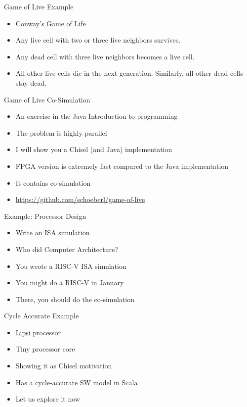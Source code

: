 \begin{frame}[fragile]{Game of Live Example}
\begin{itemize}
\item \href{https://en.wikipedia.org/wiki/Conway\%27s_Game_of_Life}{Conway's Game of Life}
\item Any live cell with two or three live neighbors survives.
\item Any dead cell with three live neighbors becomes a live cell.
\item All other live cells die in the next generation. Similarly, all other dead cells stay dead.
\end{itemize}
\end{frame}

\begin{frame}[fragile]{Game of Live Co-Simulation}
\begin{itemize}
\item An exercise in the Java Introduction to programming
\item The problem is highly parallel
\item I will show you a Chisel (and Java) implementation
\item FPGA version is extremely fast compared to the Java implementation
\item It contains co-simulation
\item \url{https://github.com/schoeberl/game-of-live}
\end{itemize}
\end{frame}

\begin{frame}[fragile]{Example: Processor Design}
\begin{itemize}
\item Write an ISA simulation
\item Who did Computer Architecture?
\item You wrote a RISC-V ISA simulation
\item You might do a RISC-V in January
\item There, you should do the co-simulation
\end{itemize}
\end{frame}

\begin{frame}[fragile]{Cycle Accurate Example}
\begin{itemize}
\item \href{https://github.com/schoeberl/lipsi}{Lipsi} processor
\item Tiny processor core
\item Showing it as Chisel motivation
\item Has a cycle-accurate SW model in Scala
\item Let us explore it now
\end{itemize}
\end{frame}

